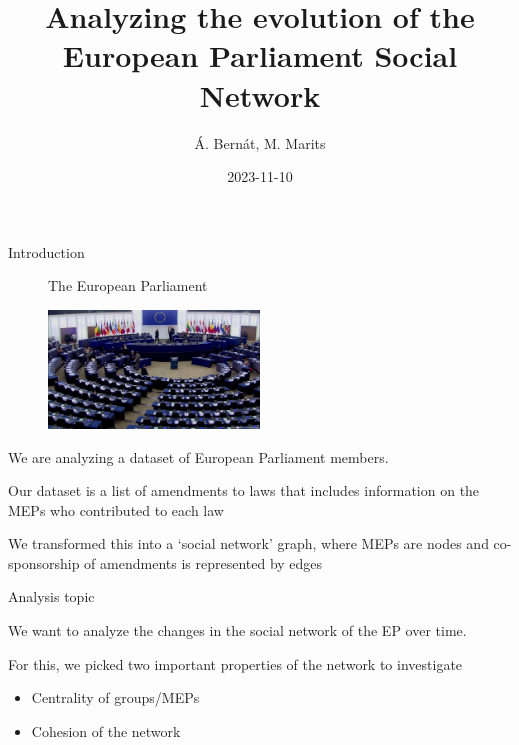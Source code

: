 \documentclass{beamer}
\title{Analyzing the evolution of the European Parliament Social Network}
\date{2023-11-10}
\author{Á. Bernát, M. Marits}
\begin{document}
\begin{frame}[plain]
    \maketitle
\end{frame}

\begin{frame}{Introduction}
	
	\begin{figure}
		The European Parliament
	
		\includegraphics[width=0.5\textwidth]{img/euparl.jpg}
	\end{figure}

	\pause We are analyzing a dataset of European Parliament members.
	
	\vspace{2mm}
	
	\pause Our dataset is a list of amendments to laws that includes information on the MEPs who contributed to each law
	
	\vspace{2mm}
	
	\pause We transformed this into a `social network' graph, where MEPs are nodes and co-sponsorship of amendments is represented by edges

	
\end{frame}

\begin{frame}{Analysis topic}
	
	We want to analyze the changes in the social network of the EP over time.
	
	\vspace{2mm}
	
	\pause For this, we picked two important properties of the network to investigate\begin{itemize}
		\pause \item Centrality of groups/MEPs
		
		\pause \item Cohesion of the network
	\end{itemize}
	
\end{frame}
\end{document}
